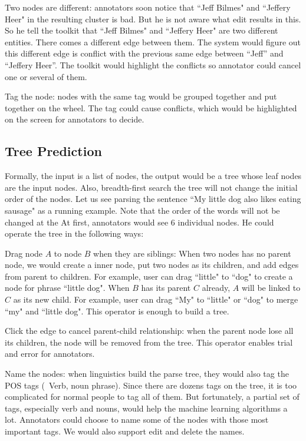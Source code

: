 Two nodes are different: annotators soon notice that ``Jeff Bilmes" and ``Jeffery Heer" in the resulting cluster is bad. But he is not aware what edit results in this. So he tell the toolkit that ``Jeff Bilmes" and ``Jeffery Heer" are two different entities. There comes a different edge between them. The system would figure out this different edge is conflict with the previous same edge between ``Jeff'' and ``Jeffery Heer''. The toolkit would highlight the conflicts so annotator could cancel one or several of them.

Tag the node: nodes with the same tag would be grouped together and put together on the wheel. The tag could cause conflicts, which would be highlighted on the screen for annotators to decide.


\subsection{Tree Prediction}
Formally, the input is a list of nodes, the output would be a tree whose leaf nodes are the input nodes. Also, breadth-first search the tree will not change the initial order of the nodes. Let us see parsing the sentence ``My little dog also likes eating sausage" as a running example.  Note that the order of the words will not be changed at the  At first, annotators would see 6 individual nodes. He could operate the tree in the following ways: 

Drag node $A$ to node $B$ when they are siblings: When two nodes has no parent node, we would create a inner node, put two nodes as its children, and add edges from parent to children. For example, user can drag ``little" to ``dog" to create a node for phrase ``little dog". When $B$ has its parent $C$ already, $A$ will be linked to $C$ as its new child. For example, user can drag ``My" to ``little" or ``dog" to merge ``my" and ``little dog". This operator is enough to build a tree.

Click the edge to cancel parent-child relationship: when the parent node lose all its children, the node will be removed from the tree. This operator enables trial and error for annotators. 

Name the nodes: when linguistics build the parse tree, they would also tag the POS tags (\ie\ Verb, noun phrase). Since there are dozens tags on the tree, it is too complicated for normal people to tag all of them. But fortunately, a partial set of tags, especially verb and nouns, would help the machine learning algorithms a lot. Annotators could choose to name some of the nodes with those most important tags. We would also support edit and delete the names. 






